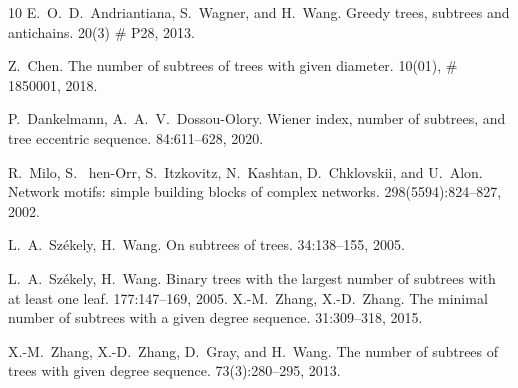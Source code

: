 \documentclass[a4paper,12pt]{amsart}
\theoremstyle{remark}
\begin{document}
\begin{thebibliography}{10}
E.~O.~D.~Andriantiana, S.~Wagner, and H.~Wang.
\newblock Greedy trees, subtrees and antichains.
 20(3) \# P28, 2013.

Z.~Chen.
\newblock The number of subtrees of trees with given diameter.
 10(01), \# 1850001, 2018.

P.~Dankelmann, A.~A.~V.~Dossou-Olory.
\newblock Wiener index, number of subtrees, and tree eccentric sequence.
 84:611--628, 2020.

R.~Milo, S. ~hen-Orr, S.~Itzkovitz, N.~Kashtan, D.~Chklovskii, and U.~Alon. 
\newblock Network motifs: simple building blocks of complex networks. 
 298(5594):824--827, 2002.


L.~A.~Sz\'ekely, H.~Wang.
\newblock On subtrees of trees.
 34:138--155, 2005.

L.~A.~Sz\'ekely, H.~Wang.
\newblock Binary trees with the largest number of subtrees with at least one leaf. 
 177:147--169, 2005.
%	
X.-M.~Zhang, X.-D.~Zhang.
\newblock The minimal number of subtrees with a given degree sequence.
 31:309--318, 2015.

X.-M.~Zhang, X.-D.~Zhang, D.~Gray, and H.~Wang.
\newblock The number of subtrees of trees with given degree sequence.
 73(3):280--295, 2013.



\end{thebibliography}
\end{document}
